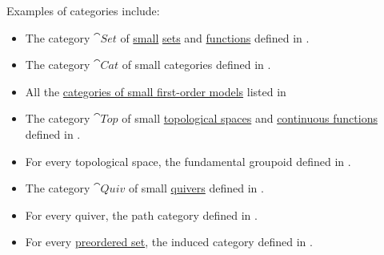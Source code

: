 \begin{example}\label{ex:def:category}
  Examples of categories include:

  \begin{itemize}
    \item The category \( \cat{Set} \) of \hyperref[def:large_and_small_sets]{small} \hyperref[def:set]{sets} and \hyperref[def:function]{functions} defined in .

    \item The category \( \cat{Cat} \) of small categories defined in .

    \item All the \hyperref[def:category_of_small_first_order_models]{categories of small first-order models} listed in 

    \item The category \( \cat{Top} \) of small \hyperref[def:topological_space]{topological spaces} and \hyperref[def:global_continuity]{continuous functions} defined in .

    \item For every topological space, the fundamental groupoid defined in .

    \item The category \( \cat{Quiv} \) of small \hyperref[def:quiver]{quivers} defined in .

    \item For every quiver, the path category defined in .

    \item For every \hyperref[def:preordered_set]{preordered set}, the induced category defined in .
  \end{itemize}
\end{example}

